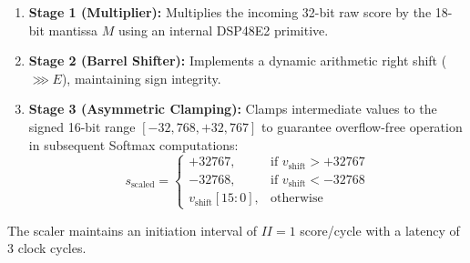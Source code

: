 \begin{enumerate}
    \item \textbf{Stage 1 (Multiplier):} Multiplies the incoming 32-bit raw score by the 18-bit mantissa $M$ using an internal DSP48E2 primitive.
    \item \textbf{Stage 2 (Barrel Shifter):} Implements a dynamic arithmetic right shift ($\ggg E$), maintaining sign integrity.
    \item \textbf{Stage 3 (Asymmetric Clamping):} Clamps intermediate values to the signed 16-bit range $[-32,768, +32,767]$ to guarantee overflow-free operation in subsequent Softmax computations:
    \begin{equation}
        s_{\text{scaled}} = 
        \begin{cases}
            +32767, & \text{if } v_{\text{shift}} > +32767 \\
            -32768, & \text{if } v_{\text{shift}} < -32768 \\
            v_{\text{shift}}[15:0], & \text{otherwise}
        \end{cases}
    \end{equation}
\end{enumerate}

The scaler maintains an initiation interval of $II = 1$ score/cycle with a latency of 3 clock cycles.

